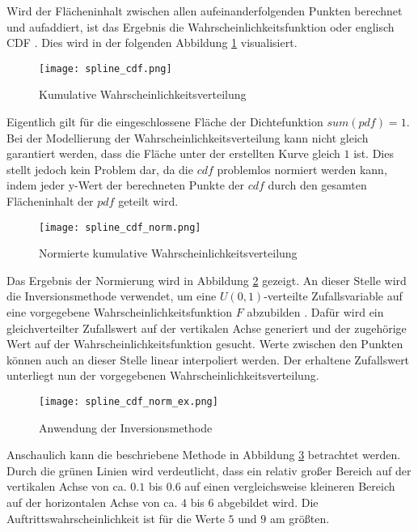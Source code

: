 Wird der Flächeninhalt zwischen allen aufeinanderfolgenden Punkten berechnet und aufaddiert, ist das Ergebnis die Wahrscheinlichkeitsfunktion oder englisch \ac{CDF} \cite{denker:2008}. Dies wird in der folgenden Abbildung \ref{fig:cdf} visualisiert.

\begin{figure}[H]
    \centering
    \texttt{[image: spline\_cdf.png]}
    \caption{Kumulative Wahrscheinlichkeitsverteilung}\label{fig:cdf}
\end{figure}

Eigentlich gilt für die eingeschlossene Fläche der Dichtefunktion $sum(pdf)=1$. Bei der Modellierung der Wahrscheinlichkeitsverteilung kann nicht gleich garantiert werden, dass die Fläche unter der erstellten Kurve gleich $1$ ist. Dies stellt jedoch kein Problem dar, da die $cdf$ problemlos normiert werden kann, indem jeder y-Wert der berechneten Punkte der $cdf$ durch den gesamten Flächeninhalt der $pdf$ geteilt wird.

\begin{figure}[H]
    \centering
    \texttt{[image: spline\_cdf\_norm.png]}
    \caption{Normierte kumulative Wahrscheinlichkeitsverteilung}\label{fig:cdfnorm}
\end{figure}

Das Ergebnis der Normierung wird in Abbildung \ref{fig:cdfnorm} gezeigt.
An dieser Stelle wird die Inversionsmethode verwendet, um eine $U(0,1)$-verteilte Zufallsvariable auf eine vorgegebene Wahrscheinlichkeitsfunktion $F$ abzubilden \cite{Inversionsmethode}. Dafür wird ein gleichverteilter Zufallswert auf der vertikalen Achse generiert und der zugehörige Wert auf der Wahrscheinlichkeitsfunktion gesucht. Werte zwischen den Punkten können auch an dieser Stelle linear interpoliert werden. Der erhaltene Zufallswert unterliegt nun der vorgegebenen Wahrscheinlichkeitsverteilung.

\begin{figure}[H]
    \centering
    \texttt{[image: spline\_cdf\_norm\_ex.png]}
    \caption{Anwendung der Inversionsmethode}\label{fig:cdfnormex}
\end{figure}

Anschaulich kann die beschriebene Methode in Abbildung \ref{fig:cdfnormex} betrachtet werden. Durch die grünen Linien wird verdeutlicht, dass ein relativ großer Bereich auf der vertikalen Achse von ca. $0.1$ bis $0.6$ auf einen vergleichsweise kleineren Bereich auf der horizontalen Achse von ca. $4$ bis $6$ abgebildet wird. Die Auftrittswahrscheinlichkeit ist für die Werte $5$ und $9$ am größten.

